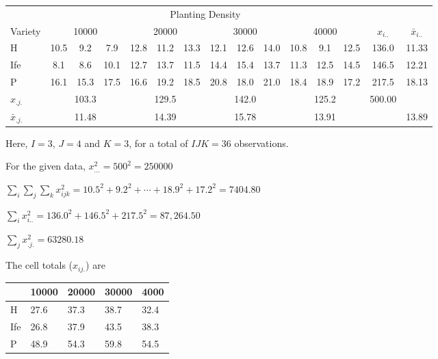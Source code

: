 \documentclass{article}
\begin{document}
	
	\begin{table}[htb]
		\vspace{-0.7em}
		\centering
		\begin{tabular}{lcccccccccccc|cc}
			& \multicolumn{12}{c|}{Planting Density}                                                                         &           &                 \\ \cline{2-13}
			Variety         & \multicolumn{3}{c}{10000} & \multicolumn{3}{c}{20000} & \multicolumn{3}{c}{30000} & \multicolumn{3}{c|}{40000} & $x_{i..}$ & $\bar{x}_{i..}$ \\ \hline
			H               & 10.5    & 9.2    & 7.9    & 12.8    & 11.2   & 13.3   & 12.1    & 12.6   & 14.0   & 10.8    & 9.1     & 12.5   & 136.0     & 11.33           \\
			Ife             & 8.1     & 8.6    & 10.1   & 12.7    & 13.7   & 11.5   & 14.4    & 15.4   & 13.7   & 11.3    & 12.5    & 14.5   & 146.5     & 12.21           \\
			P               & 16.1    & 15.3   & 17.5   & 16.6    & 19.2   & 18.5   & 20.8    & 18.0   & 21.0   & 18.4    & 18.9    & 17.2   & 217.5     & 18.13           \\ \hline
			$x_{.j.}$       & \multicolumn{3}{c}{103.3} & \multicolumn{3}{c}{129.5} & \multicolumn{3}{c}{142.0} & \multicolumn{3}{c|}{125.2} & 500.00    &                 \\
			$\bar{x}_{.j.}$ & \multicolumn{3}{c}{11.48} & \multicolumn{3}{c}{14.39} & \multicolumn{3}{c}{15.78} & \multicolumn{3}{c|}{13.91} &           & 13.89          
		\end{tabular}
	\vspace{-0.7em}
	\end{table}
	
	
	Here, $I=3$, $J=4$ and $K=3$, for a total of $IJK = 36$ observations.
	
	For the given data, $x_{...}^2 = 500^2 = 250000$
	
	$\sum _ { i } \sum _ { j } \sum _ { k } x _ { i j k } ^ { 2 } = 10.5 ^ { 2 } + 9.2 ^ { 2 } + \cdots + 18.9 ^ { 2 } + 17.2 ^ { 2 } = 7404.80$
	
	$\sum _ { i } x _ { i . . } ^ { 2 } = 136.0 ^ { 2 } + 146.5 ^ { 2 } + 217.5 ^ { 2 } = 87,264.50$
	
	$\sum_j x^2_{.j.} = 63280.18$
	
	The cell totals ($x_{ij.}$) are
	
	
	\begin{table}[htb]
		\vspace{-0.8em}
		\centering
		\begin{tabular}{lllll}
			& 10000 & 20000 & 30000 & 4000 \\\hline
			H   & 27.6  & 37.3  & 38.7  & 32.4 \\
			Ife & 26.8  & 37.9  & 43.5  & 38.3 \\
			P   & 48.9  & 54.3  & 59.8  & 54.5
		\end{tabular}
	\vspace{-0.8em}
	\end{table}
	
\end{document}
